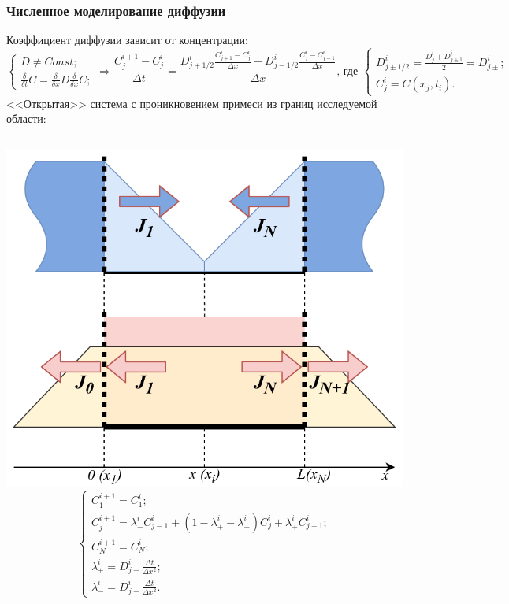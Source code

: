 \documentclass[10pt,pdf,hyperref={unicode},aspectratio={169}]{beamer}
\begin{document}
\begin{frame}
	\frametitle{Численное моделирование диффузии}
	{\color{blue}Коэффициент диффузии зависит от концентрации}:
	\small
	\begin{equation*}
		\begin{cases}
			D \neq Const;\\
			\frac{\delta}{\delta t} C = \frac{\delta}{\delta x} D \frac{\delta}{\delta x} C;
		\end{cases} \Rightarrow
		\frac{C_{j}^{i+1} - C_{j}^{i}}{\Delta t} = \frac{ D_{j+1/2}^{i}\frac{C^{i}_{j+1} - C^{i}_{j}}{\Delta x} - D_{j-1/2}^{i}\frac{C^{i}_{j} - C^{i}_{j-1}}{\Delta x} }{\Delta x},\,\text{где }		
		\begin{cases}
			D_{j\pm1/2}^{i} = \frac{D^{i}_{j} + D^{i}_{j\pm1}}{2} = D_{j\pm}^{i};\\
			C^{i}_{j} = C(x_{j}, t_{i}).
		\end{cases}
	\end{equation*}
		{\color{red}<<Открытая>> система с проникновением примеси из границ исследуемой области:}\\
		\begin{columns}
		   	\includegraphics[width=\linewidth]{assets/ODSI}
			\large
			\begin{equation*}
				\label{eq:DFromC}
				\begin{cases}
					C^{i+1}_{1} = C^{i}_{1};\\
					C^{i+1}_{j} = \lambda_{-}^{i} C^{i}_{j-1} + (1 - \lambda^{i}_{+} - \lambda^{i}_{-})C^{i}_{j} + \lambda^{i}_{+} C^{i}_{j+1};\\
					C^{i+1}_{N} = C^{i}_{N};\\
					\lambda^{i}_{+} = D_{j+}^{i}\frac{\Delta t}{\Delta x^{2}};\\
					\lambda^{i}_{-} = D_{j-}^{i}\frac{\Delta t}{\Delta x^{2}}.
				\end{cases}
			\end{equation*}
		\end{columns}

\end{frame}
\end{document}
